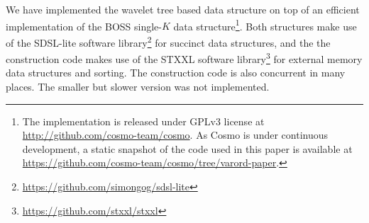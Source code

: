 \begin{table}
\begin{tabularx}{\linewidth}{@{}rd{3.2}d{4.9}d{3.2}d{4.9}d{3.2}d{5.9}d{3.2}d{5.9}@{}}

\bottomrule
\end{tabularx}
\label{tab:nav-time}
\end{table}

We have implemented the wavelet tree based data structure on top of an efficient implementation of the BOSS single-$K$ data structure\footnote{The
implementation is released under GPLv3 license at \url{http://github.com/cosmo-team/cosmo}. As Cosmo is under continuous development,
a static snapshot of the code used in this paper is available at \url{https://github.com/cosmo-team/cosmo/tree/varord-paper}.}.
Both structures make use of the SDSL-lite software library\footnote{\url{https://github.com/simongog/sdsl-lite}} for succinct data structures, and the
the construction code makes use of the STXXL software library\footnote{\url{https://github.com/stxxl/stxxl}} for external memory data structures and sorting.
The construction code is also concurrent in many places.%
The smaller but slower version was not implemented.


